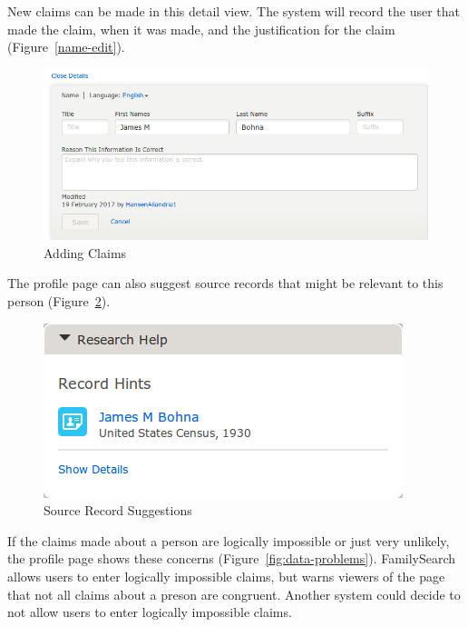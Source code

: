 \documentclass[format=siggraph, review=true]{acmart}
\begin{document}
New claims can be made in this detail view. The system will record
the user that made the claim, when it was made, and the justification
for the claim (Figure~\ref{name-edit}).

\begin{figure}[h]
\includegraphics[width=\columnwidth]{images/familysearch/name-edit.png}
\caption{Adding Claims}
\label{fig:name-edit}
\end{figure}

The profile page can also suggest source records that might be
relevant to this person (Figure~\ref{fig:record-hint}).

\begin{figure}[h]
\includegraphics[width=\columnwidth]{images/familysearch/record-hint.png}
\caption{Source Record Suggestions}
\label{fig:record-hint}
\end{figure}

If the claims made about a person are logically impossible or just
very unlikely, the profile page shows these concerns
(Figure~\ref{fig:data-problems}). FamilySearch allows users to
enter logically impossible claims, but warns viewers of the
page that not all claims about a preson are congruent. Another system could
decide to not allow users to enter logically impossible claims.
\end{document}
